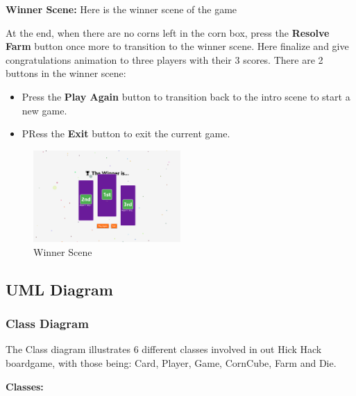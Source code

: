\documentclass[conference]{IEEEtran}
\begin{document}
\vspace{0.5cm}



\vspace{0.5cm}

\textbf{Winner Scene:}
Here is the winner scene of the game

At the end, when there are no corns left in the corn box, press the \textbf{Resolve Farm} button once more to transition to the winner scene. Here finalize and give congratulations animation to three players with their 3 scores. There are 2 buttons in the winner scene: 


\begin{itemize}
    \item Press the \textbf{Play Again} button to transition back to the intro scene to start a new game.
    \item PRess the \textbf{Exit} button to exit the current game.
\end{itemize}

\begin{figure}
    \centering
    \includegraphics[width=0.5\textwidth]{img/Screenshot 2025-01-14 122727.png} %
    \caption{Winner Scene}
    \label{fig:winner-scene}
\end{figure}

\newpage

\subsection{UML Diagram}

\subsubsection{Class Diagram}



The Class diagram illustrates 6 different classes involved in out Hick Hack boardgame, with those being: Card, Player, Game, CornCube, Farm and Die.

\textbf{Classes:}
\end{document}
